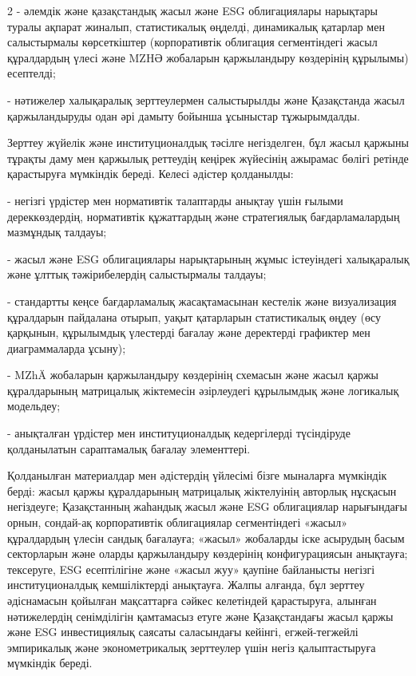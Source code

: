 \begin{multicols}{2}
- әлемдік және қазақстандық жасыл және ESG облигациялары нарықтары
туралы ақпарат жиналып, статистикалық өңделді, динамикалық қатарлар мен
салыстырмалы көрсеткіштер (корпоративтік облигация сегментіндегі жасыл
құралдардың үлесі және MZHӘ жобаларын қаржыландыру көздерінің құрылымы)
есептелді;

- нәтижелер халықаралық зерттеулермен салыстырылды және Қазақстанда
жасыл қаржыландыруды одан әрі дамыту бойынша ұсыныстар тұжырымдалды.

Зерттеу жүйелік және институционалдық тәсілге негізделген, бұл жасыл
қаржыны тұрақты даму мен қаржылық реттеудің кеңірек жүйесінің ажырамас
бөлігі ретінде қарастыруға мүмкіндік береді. Келесі әдістер қолданылды:

- негізгі үрдістер мен нормативтік талаптарды анықтау үшін ғылыми
дереккөздердің, нормативтік құжаттардың және стратегиялық
бағдарламалардың мазмұндық талдауы;

- жасыл және ESG облигациялары нарықтарының жұмыс істеуіндегі
халықаралық және ұлттық тәжірибелердің салыстырмалы талдауы;

- стандартты кеңсе бағдарламалық жасақтамасынан кестелік және
визуализация құралдарын пайдалана отырып, уақыт қатарларын статистикалық
өңдеу (өсу қарқынын, құрылымдық үлестерді бағалау және деректерді
графиктер мен диаграммаларда ұсыну);

- MZhÄ жобаларын қаржыландыру көздерінің схемасын және жасыл қаржы
құралдарының матрицалық жіктемесін әзірлеудегі құрылымдық және логикалық
модельдеу;

- анықталған үрдістер мен институционалдық кедергілерді түсіндіруде
қолданылатын сараптамалық бағалау элементтері.

Қолданылған материалдар мен әдістердің үйлесімі бізге мыналарға
мүмкіндік берді: жасыл қаржы құралдарының матрицалық жіктелуінің
авторлық нұсқасын негіздеуге; Қазақстанның жаһандық жасыл және ESG
облигациялар нарығындағы орнын, сондай-ақ корпоративтік облигациялар
сегментіндегі «жасыл» құралдардың үлесін сандық бағалауға; «жасыл»
жобаларды іске асырудың басым секторларын және оларды қаржыландыру
көздерінің конфигурациясын анықтауға; тексеруге, ESG есептілігіне және
«жасыл жуу» қаупіне байланысты негізгі институционалдық кемшіліктерді
анықтауға. Жалпы алғанда, бұл зерттеу әдіснамасын қойылған мақсаттарға
сәйкес келетіндей қарастыруға, алынған нәтижелердің сенімділігін
қамтамасыз етуге және Қазақстандағы жасыл қаржы және ESG инвестициялық
саясаты саласындағы кейінгі, егжей-тегжейлі эмпирикалық және
эконометрикалық зерттеулер үшін негіз қалыптастыруға мүмкіндік береді.


\end{multicols}
